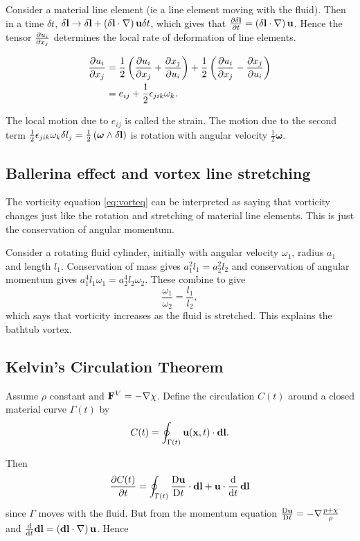 \documentclass{notes}
\newcommand{\matd}[1]{\DDt{#1}}
\newcommand{\bso}{\boldsymbol\omega}
\newcommand{\grad}{\nabla}
\newcommand{\dgrad}[2]{\left(#1\cdot\nabla\right)#2}
\begin{document}
Consider a material line element (ie a line element moving with the
fluid).  Then in a time $\delta t$, $\delta \vect{l} \rightarrow
\delta \vect{l} + \dgrad{\delta \vect{l}}{\vu}\delta t$, which gives
that $\pd{\delta \vect{l}}{t} = \dgrad{\delta \vect{l}}{\vu}$.  Hence
the tensor $\frac{\partial u_i}{\partial x_j}$ determines the local rate of deformation of
line elements.

\begin{align*}
  \frac{\partial u_i}{\partial x_j} &= \frac{1}{2} \left( \frac{\partial u_i}{\partial x_j} + \frac{\partial x_j}{\partial u_i}
  \right)
  + \frac{1}{2} \left( \frac{\partial u_i}{\partial x_j} - \frac{\partial x_j}{\partial u_i} \right) \\
  &=e_{ij} + \frac{1}{2} \epsilon_{jik}\omega_k.
\end{align*}

The local motion due to $e_{ij}$ is called the strain.  The motion due
to the second term $\frac{1}{2}\epsilon_{jik}\omega_k \delta l_j =
\frac{1}{2} \left( \bso \wedge \delta \vect{l} \right)$ is rotation
with angular velocity $\frac{1}{2} \bso$.

\subsection{Ballerina effect and vortex line stretching}

The vorticity equation \eqref{eq:vorteq} can be interpreted as saying
that vorticity changes just like the rotation and stretching of
material line elements.  This is just the conservation of angular
momentum.

Consider a rotating fluid cylinder, initially with angular velocity
$\omega_1$, radius $a_1$ and length $l_1$.  Conservation of mass gives
$a_1^2 l_1 = a_2^2 l_2$ and conservation of angular momentum gives
$a_1^4 l_1 \omega_1 = a_2^4 l_2 \omega_2$.  These combine to give
\[
\frac{\omega_1}{\omega_2} = \frac{l_1}{l_2},
\]
which says that vorticity increases as the fluid is stretched.  This
explains the bathtub vortex.

\subsection{Kelvin's Circulation Theorem}

Assume $\rho$ constant and $\vF^V = -\grad{\chi}$.  Define the
circulation $C(t)$ around a closed material curve $\Gamma(t)$ by
\[
C(t) = \oint_{\Gamma(t)} \mathbf{u}(\mathbf{x},t)\cdot\mathbf{dl}.
\]

Then
\[
\pd{C(t)}{t} = \oint_{\Gamma(t)} \matd{\vu}\cdot\vect{dl} +
\vu\cdot\frac{\ud}{\ud t}\, \vect{dl}
\]
since $\Gamma$ moves with the fluid.  But from the momentum equation
$\matd{\vu} = -\grad{\frac{p+\chi}{\rho}}$ and $\frac{\ud}{\ud
  t}\vect{dl}= \dgrad{\vect{dl}}{\vu}$.  Hence
\end{document}

